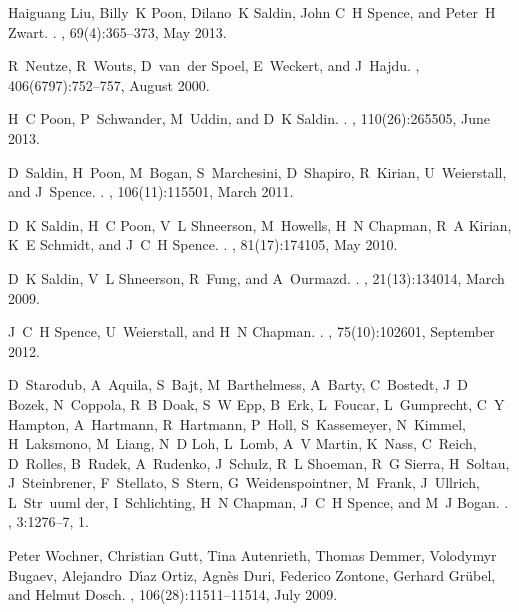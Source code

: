 \documentclass [11pt,fleqn]{article}
\begin{document}
\begin{thebibliography}{10}
Haiguang Liu, Billy~K Poon, Dilano~K Saldin, John C~H Spence, and Peter~H
  Zwart.
.
, 69(4):365--373, May 2013.

R~Neutze, R~Wouts, D~van~der Spoel, E~Weckert, and J~Hajdu.
, 406(6797):752--757, August 2000.

H~C Poon, P~Schwander, M~Uddin, and D~K Saldin.
.
, 110(26):265505, June 2013.

D~Saldin, H~Poon, M~Bogan, S~Marchesini, D~Shapiro, R~Kirian, U~Weierstall, and
  J~Spence.
.
, 106(11):115501, March 2011.

D~K Saldin, H~C Poon, V~L Shneerson, M~Howells, H~N Chapman, R~A Kirian, K~E
  Schmidt, and J~C~H Spence.
.
, 81(17):174105, May 2010.

D~K Saldin, V~L Shneerson, R~Fung, and A~Ourmazd.
.
, 21(13):134014, March 2009.

J~C~H Spence, U~Weierstall, and H~N Chapman.
.
, 75(10):102601, September 2012.

D~Starodub, A~Aquila, S~Bajt, M~Barthelmess, A~Barty, C~Bostedt, J~D Bozek,
  N~Coppola, R~B Doak, S~W Epp, B~Erk, L~Foucar, L~Gumprecht, C~Y Hampton,
  A~Hartmann, R~Hartmann, P~Holl, S~Kassemeyer, N~Kimmel, H~Laksmono, M~Liang,
  N~D Loh, L~Lomb, A~V Martin, K~Nass, C~Reich, D~Rolles, B~Rudek, A~Rudenko,
  J~Schulz, R~L Shoeman, R~G Sierra, H~Soltau, J~Steinbrener, F~Stellato,
  S~Stern, G~Weidenspointner, M~Frank, J~Ullrich, L~Str~uuml der,
  I~Schlichting, H~N Chapman, J~C~H Spence, and M~J Bogan.
.
, 3:1276--7, 1.

Peter Wochner, Christian Gutt, Tina Autenrieth, Thomas Demmer, Volodymyr
  Bugaev, Alejandro~D{\'\i}az Ortiz, Agn{\`e}s Duri, Federico Zontone, Gerhard
  Gr{\"u}bel, and Helmut Dosch.
, 106(28):11511--11514, July 2009.

\end{thebibliography}
\end{document}

